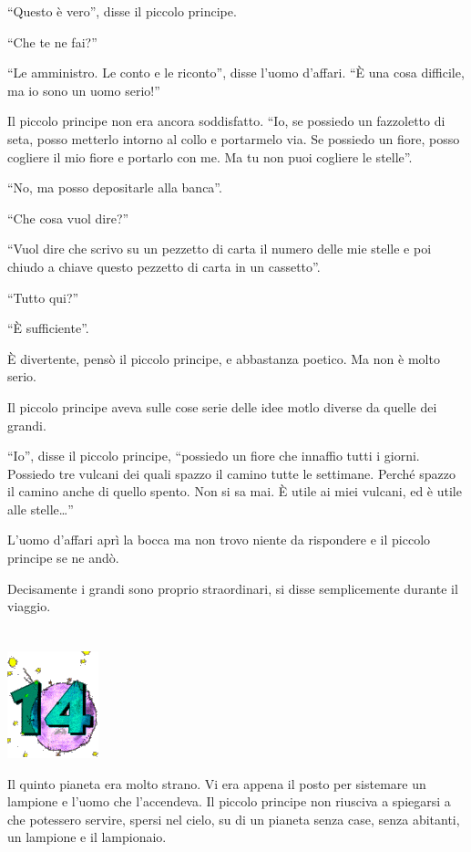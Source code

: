 \documentclass[11pt]{scrbook}
\begin{document}
``Questo è vero'', disse il piccolo principe.

``Che te ne fai?''

``Le amministro. Le conto e le riconto'', disse l'uomo d'affari. ``È una cosa difficile, ma io sono un uomo serio!''

Il piccolo principe non era ancora soddisfatto. ``Io, se possiedo un fazzoletto di seta, posso metterlo intorno al collo e portarmelo via. Se possiedo un fiore, posso cogliere il mio fiore e portarlo con me. Ma tu non puoi cogliere le stelle''.

``No, ma posso depositarle alla banca''.

``Che cosa vuol dire?''

``Vuol dire che scrivo su un pezzetto di carta il numero delle mie
stelle e poi chiudo a chiave questo pezzetto di carta in un cassetto''.

``Tutto qui?''

``È sufficiente''.

È divertente, pensò il piccolo principe, e abbastanza poetico. Ma non è
molto serio.

Il piccolo principe aveva sulle cose serie delle idee motlo diverse da quelle dei grandi.

``Io'', disse il piccolo principe, ``possiedo un fiore che innaffio tutti i giorni. Possiedo tre vulcani dei quali spazzo il camino tutte le settimane. Perché spazzo il camino anche di quello spento. Non si sa mai. È utile ai miei vulcani, ed è utile alle stelle\ldots{}''

L'uomo d'affari aprì la bocca ma non trovo niente da rispondere e il piccolo principe se ne andò.

Decisamente i grandi sono proprio straordinari, si disse semplicemente durante il viaggio.

\chapter{}
\begin{center}
\includegraphics{img/chapter14}
\end{center}

Il quinto pianeta era molto strano. Vi era appena il posto per sistemare un lampione e l'uomo che l'accendeva. Il piccolo principe non riusciva a spiegarsi a che potessero servire, spersi nel cielo, su di un pianeta senza case, senza abitanti, un lampione e il lampionaio.
\end{document}
